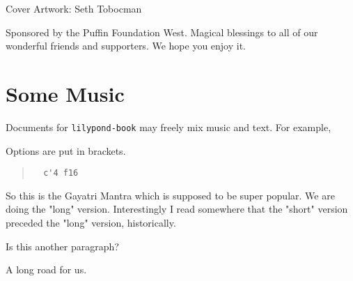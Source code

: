 \documentclass[a5paper,twoside,9pt]{extbook}
\newtheorem{I Surrender}{Definition}
\begin{document}
   
  Cover Artwork: Seth Tobocman
  \newline
  
  Sponsored by the Puffin Foundation West.
  \newline
  \newline
  Magical blessings to all of our wonderful friends and supporters.
  \newline
  \newline
  We hope you enjoy it.

\pagebreak{}

\section{Some Music}

Documents for \verb+lilypond-book+ may freely mix music and text.
For example,

{%
\parindent 0pt
\noindent
\ifx\preLilyPondExample \undefined
\else
  \expandafter\preLilyPondExample
\fi
\def\lilypondbook{}%

\ifx\postLilyPondExample \undefined
\else
  \expandafter\postLilyPondExample
\fi
}

Options are put in brackets.

\begin{quote}
\noindent
\begin{verbatim}
  c'4 f16
\end{verbatim}
{%
\parindent 0pt
\noindent
\ifx\preLilyPondExample \undefined
\else
  \expandafter\preLilyPondExample
\fi
\def\lilypondbook{}%

\ifx\postLilyPondExample \undefined
\else
  \expandafter\postLilyPondExample
\fi
}
\end{quote}

So this is the Gayatri Mantra which is supposed to be super popular. We are doing the "long" version. Interestingly I read somewhere that the "short" version preceded the "long" version, historically.

Is this another paragraph?

\begin{quote}
{%
\parindent 0pt
\noindent
\ifx\preLilyPondExample \undefined
\else
  \expandafter\preLilyPondExample
\fi
\def\lilypondbook{}%

\ifx\postLilyPondExample \undefined
\else
  \expandafter\postLilyPondExample
\fi
}
\end{quote}

A long road for us.
\end{document}
